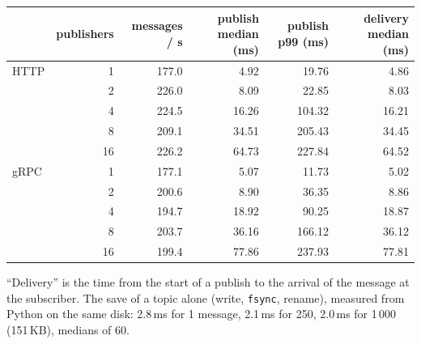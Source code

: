 \documentclass[11pt,a4paper]{article}
\newcommand{\code}[1]{{\frenchspacing\texttt{#1}}}
\begin{document}
\begin{center}
\small
\begin{tabular}{@{}lrrrrr@{}}
\toprule
 & publishers & messages / s & publish median (ms) & publish p99 (ms) & delivery median (ms) \\
\midrule
HTTP & 1  & 177.0 & 4.92  & 19.76  & 4.86 \\
     & 2  & 226.0 & 8.09  & 22.85  & 8.03 \\
     & 4  & 224.5 & 16.26 & 104.32 & 16.21 \\
     & 8  & 209.1 & 34.51 & 205.43 & 34.45 \\
     & 16 & 226.2 & 64.73 & 227.84 & 64.52 \\
\midrule
gRPC & 1  & 177.1 & 5.07  & 11.73  & 5.02 \\
     & 2  & 200.6 & 8.90  & 36.35  & 8.86 \\
     & 4  & 194.7 & 18.92 & 90.25  & 18.87 \\
     & 8  & 203.7 & 36.16 & 166.12 & 36.12 \\
     & 16 & 199.4 & 77.86 & 237.93 & 77.81 \\
\bottomrule
\end{tabular}
\end{center}

``Delivery'' is the time from the start of a publish to the arrival of the message at the subscriber.
The save of a topic alone (write, \code{fsync}, rename), measured from Python on the same disk: 2.8\,ms
for 1 message, 2.1\,ms for 250, 2.0\,ms for 1\,000 (151\,KB), medians of 60.
\end{document}

